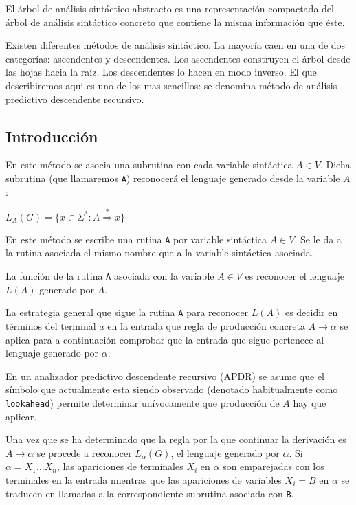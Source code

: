 El árbol de análisis sintáctico abstracto es una representación  compactada del árbol 
de análisis sintáctico concreto que contiene la misma información que éste.

Existen diferentes métodos de análisis sintáctico. La mayoría caen en una de dos categorías:
ascendentes y descendentes. Los ascendentes construyen el árbol desde las hojas
hacia la raíz. Los descendentes lo hacen en modo inverso. El que describiremos
aqui es uno de los mas sencillos: se denomina método de análisis predictivo descendente 
recursivo.

\subsection{Introducción}
\label{subsection:introduccion}
En este método se asocia una subrutina con cada variable sintáctica $A \in V$. Dicha subrutina 
(que llamaremos \verb|A|) reconocerá el lenguaje generado desde la variable $A$:

\begin{center}
$L_A(G) = \{ x \in \Sigma^* : A \stackrel{*}{\Longrightarrow} x \}$
\end{center}

En este método se escribe una rutina \verb|A| por variable sintáctica $A \in V$. 
Se le da a la rutina asociada el mismo nombre que a la variable sintáctica
asociada. 

La función de la rutina \verb|A| asociada con la variable
$A \in V$ es reconocer el lenguaje $L(A)$ generado por $A$.

La estrategia general que sigue la rutina \verb|A| para reconocer
$L(A)$ es decidir en términos del terminal $a$ en la entrada
que regla de producción concreta $A \rightarrow \alpha$ se aplica para
a continuación comprobar que la entrada que sigue pertenece al lenguaje generado por 
$\alpha$. 

En un analizador predictivo descendente recursivo (APDR) se asume que
el símbolo que actualmente
esta siendo observado (denotado habitualmente como 
\verb|lookahead|) permite determinar unívocamente
que producción de $A$ hay que aplicar. 

Una vez que se ha determinado que la regla por la que continuar la derivación
es $A \rightarrow \alpha$ se procede a reconocer $L_{\alpha}(G)$,
el lenguaje generado por $\alpha$. Si $\alpha = X_1 \ldots X_n$,
las apariciones de terminales $X_i$ en $\alpha$ son emparejadas
con los terminales en la entrada mientras que las apariciones de variables $X_i = B$
en $\alpha$ se traducen en llamadas a la correspondiente subrutina asociada con \verb|B|.

